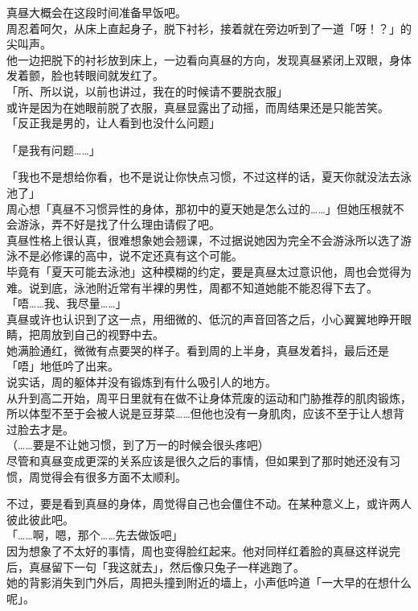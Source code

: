 真昼大概会在这段时间准备早饭吧。\\

周忍着呵欠，从床上直起身子，脱下衬衫，接着就在旁边听到了一道「呀！？」的尖叫声。\\

他一边把脱下的衬衫放到床上，一边看向真昼的方向，发现真昼紧闭上双眼，身体发着颤，脸也转眼间就发红了。\\

「所、所以说，以前也讲过，我在的时候请不要脱衣服」\\

或许是因为在她眼前脱了衣服，真昼显露出了动摇，而周结果还是只能苦笑。\\

「反正我是男的，让人看到也没什么问题」

「是我有问题……」

「我也不是想给你看，也不是说让你快点习惯，不过这样的话，夏天你就没法去泳池了」\\

周心想「真昼不习惯异性的身体，那初中的夏天她是怎么过的……」但她压根就不会游泳，弄不好是找了什么理由请假了吧。\\

真昼性格上很认真，很难想象她会翘课，不过据说她因为完全不会游泳所以选了游泳不是必修课的高中，说不定还真有这个可能。\\

毕竟有「夏天可能去泳池」这种模糊的约定，要是真昼太过意识他，周也会觉得为难。说到底，泳池附近常有半裸的男性，周都不知道她能不能忍得下去了。\\

「唔……我、我尽量……」\\

真昼或许也认识到了这一点，用细微的、低沉的声音回答之后，小心翼翼地睁开眼睛，把周放到自己的视野中去。\\

她满脸通红，微微有点要哭的样子。看到周的上半身，真昼发着抖，最后还是「唔」地低吟了出来。\\

说实话，周的躯体并没有锻炼到有什么吸引人的地方。\\

从升到高二开始，周平日里就有在做不让身体荒废的运动和门胁推荐的肌肉锻炼，所以体型不至于会被人说是豆芽菜……但他也没有一身肌肉，应该不至于让人想背过脸去才是。\\

（……要是不让她习惯，到了万一的时候会很头疼吧）\\

尽管和真昼变成更深的关系应该是很久之后的事情，但如果到了那时她还没有习惯，周觉得会有很多方面不太顺利。

不过，要是看到真昼的身体，周觉得自己也会僵住不动。在某种意义上，或许两人彼此彼此吧。\\

「……啊，嗯，那个……先去做饭吧」\\

因为想象了不太好的事情，周也变得脸红起来。他对同样红着脸的真昼这样说完后，真昼留下一句「我这就去」，然后像只兔子一样逃跑了。\\

她的背影消失到门外后，周把头撞到附近的墙上，小声低吟道「一大早的在想什么呢」。
